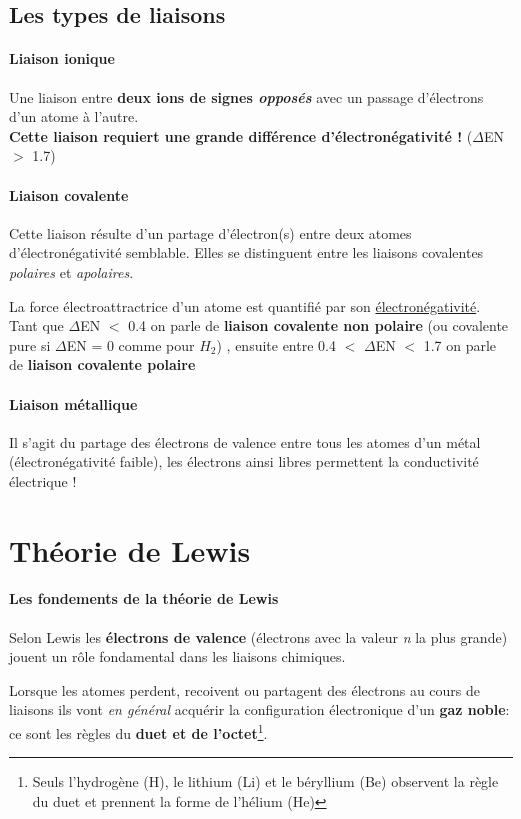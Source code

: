 \documentclass[10pt,a4paper]{book}
\begin{document}
\subsection{Les types de liaisons}
\paragraph{Liaison ionique} Une liaison entre \textbf{deux ions de signes \textit{opposés}} avec un passage d'électrons d'un atome à l'autre.\\ %
\textbf{Cette liaison requiert une grande différence d'électronégativité !} ($\Delta$EN $>$ 1.7)
\paragraph{Liaison covalente} Cette liaison résulte d'un partage d'électron(s) entre deux atomes d'électronégativité semblable. Elles se distinguent entre les liaisons covalentes \textit{polaires} et \textit{apolaires}. \par
La force électroattractrice d'un atome est quantifié par son \hyperlink{electronegativity}{électronégativité}. Tant que $\Delta$EN $<$ 0.4 on parle de \textbf{liaison covalente non polaire} (ou covalente pure si $\Delta$EN = 0 comme pour $H_2$) , ensuite  entre 0.4 $<$ $\Delta$EN $<$ 1.7 on parle de \textbf{liaison covalente polaire} 
\paragraph{Liaison métallique} Il s'agit du partage des électrons de valence entre tous les atomes d'un métal (électronégativité faible), les électrons ainsi libres permettent la conductivité électrique !
\newpage
\section{Théorie de Lewis}
\paragraph{Les fondements de la théorie de Lewis} Selon Lewis les \textbf{électrons de valence} (électrons avec la valeur \textit{n} la plus grande) jouent un rôle fondamental dans les liaisons chimiques. \par
Lorsque les atomes perdent, recoivent ou partagent des électrons au cours de liaisons ils vont \textit{en général} acquérir la configuration électronique d'un \textbf{gaz noble}: ce sont les règles du \textbf{duet et de l'octet}\footnote{Seuls l'hydrogène (H), le lithium (Li) et le béryllium (Be) observent la règle du duet et prennent la forme de l'hélium (He)}.
\end{document}
